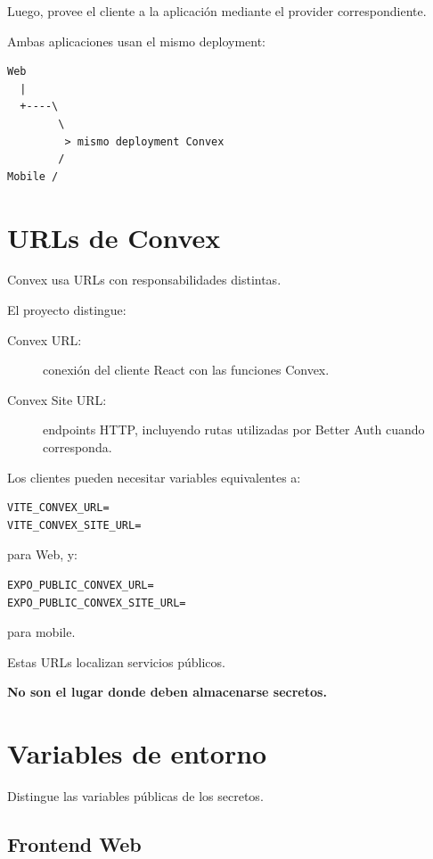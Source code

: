\documentclass[11pt,a4paper]{article}
\begin{document}
Luego, provee el cliente a la aplicación mediante el provider correspondiente.

Ambas aplicaciones usan el mismo deployment:

\begin{lstlisting}
Web
  |
  +----\
        \
         > mismo deployment Convex
        /
Mobile /
\end{lstlisting}

\section{URLs de Convex}

Convex usa URLs con responsabilidades distintas.

El proyecto distingue:

\begin{description}
  \item[Convex URL:] conexión del cliente React con las funciones Convex.
  \item[Convex Site URL:] endpoints HTTP, incluyendo rutas utilizadas por
    Better Auth cuando corresponda.
\end{description}

Los clientes pueden necesitar variables equivalentes a:

\begin{lstlisting}
VITE_CONVEX_URL=
VITE_CONVEX_SITE_URL=
\end{lstlisting}

para Web, y:

\begin{lstlisting}
EXPO_PUBLIC_CONVEX_URL=
EXPO_PUBLIC_CONVEX_SITE_URL=
\end{lstlisting}

para mobile.

Estas URLs localizan servicios públicos.

\textbf{No son el lugar donde deben almacenarse secretos.}

\section{Variables de entorno}

Distingue las variables públicas de los secretos.

\subsection{Frontend Web}
\end{document}
